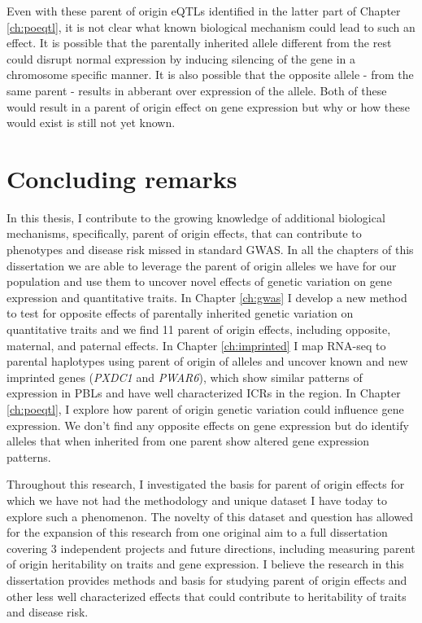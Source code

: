  Even with these parent of origin eQTLs identified in the latter part of Chapter \ref{ch:poeqtl}, it is not clear what known biological mechanism could lead to such an effect. It is possible that the parentally inherited allele different from the rest could disrupt normal expression by inducing silencing of the gene in a chromosome specific manner. It is also possible that the opposite allele - from the same parent - results in abberant over expression of the allele. Both of these would result in a parent of origin effect on gene expression but why or how these would exist is still not yet known. 

\section{Concluding remarks}

In this thesis, I contribute to the growing knowledge of additional biological mechanisms, specifically, parent of origin effects, that can contribute to phenotypes and disease risk missed in standard GWAS. In all the chapters of this dissertation we are able to leverage the parent of origin alleles we have for our population and use them to uncover novel effects of genetic variation on gene expression and quantitative traits. In Chapter \ref{ch:gwas} I develop a new method to test for opposite effects of parentally inherited genetic variation on quantitative traits and we find 11 parent of origin effects, including opposite, maternal, and paternal effects. In Chapter \ref{ch:imprinted} I map RNA-seq to parental haplotypes using parent of origin of alleles and uncover known and new imprinted genes (\emph{PXDC1} and \emph{PWAR6}), which show similar patterns of expression in PBLs and have well characterized ICRs in the region. In Chapter \ref{ch:poeqtl}, I explore how parent of origin genetic variation could influence gene expression. We don't find any opposite effects on gene expression but do identify alleles that when inherited from one parent show altered gene expression patterns. 

Throughout this research, I investigated the basis for parent of origin effects for which we have not had the methodology and unique dataset I have today to explore such a phenomenon. The novelty of this dataset and question has allowed for the expansion of this research from one original aim to a full dissertation covering 3 independent projects and future directions, including measuring parent of origin heritability on traits and gene expression. I believe the research in this dissertation provides methods and basis for studying parent of origin effects and other less well characterized effects that could contribute to heritability of traits and disease risk. 




